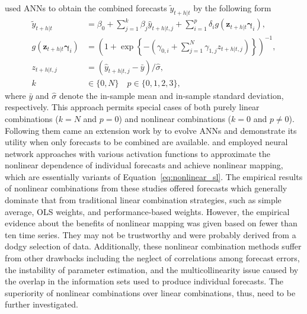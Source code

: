 \documentclass[11pt]{article}
\begin{document}
\citet{Donaldson1996-um} used ANNs to obtain the combined forecasts $\tilde{y}_{t+h|t}$ by the following form
\begin{align}
\tilde{y}_{t+h|t} &=\beta_{0}+\sum_{j=1}^{k} \beta_{j} \hat{y}_{t+h|t, j}+\sum_{i=1}^{p} \delta_{i} g\left(\boldsymbol{z}_{t+h|t} \boldsymbol{\gamma}_{i}\right), \label{eq:nonlinear_sl}\\
g\left(\boldsymbol{z}_{t+h|t} \boldsymbol{\gamma}_{i}\right) &=\left(1+\exp \left\{-\left(\gamma_{0, i}+\sum_{j=1}^{N} \gamma_{1, j} z_{t+h|t, j}\right)\right\}\right)^{-1}, \nonumber \\
z_{t+h|t, j} &=\left(\hat{y}_{t+h|t, j}-\bar{y}\right) / \hat{\sigma}, \nonumber \\
k & \in \{0,N\} \quad p \in \{0,1,2,3\}, \nonumber
\end{align}
where $\bar{y}$ and $\hat{\sigma}$ denote the in-sample mean and in-sample standard deviation, respectively. This approach permits special cases of both purely linear combinations ($k=N$ and $p=0$) and nonlinear combinations ($k=0$ and $p\neq 0$). Following them came an extension work by \citet{Harrald1997-gd} to evolve ANNs and demonstrate its utility when only forecasts to be combined are available. \citet{Krasnopolsky2012-xu} and \citet{Babikir2016-xz} employed neural network approaches with various activation functions to approximate the nonlinear dependence of individual forecasts and achieve nonlinear mapping, which are essentially variants of Equation~\eqref{eq:nonlinear_sl}. The empirical results of nonlinear combinations from these studies offered forecasts which generally dominate that from traditional linear combination strategies, such as simple average, OLS weights, and performance-based weights. However, the empirical evidence about the benefits of nonlinear mapping was given based on fewer than ten time series. They may not be trustworthy and were probably derived from a dodgy selection of data. Additionally, these nonlinear combination methods suffer from other drawbacks including the neglect of correlations among forecast errors, the instability of parameter estimation, and the multicollinearity issue caused by the overlap in the information sets used to produce individual forecasts. The superiority of nonlinear combinations over linear combinations, thus, need to be further investigated.
\end{document}
